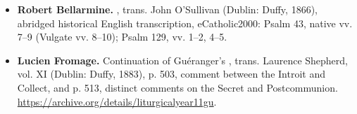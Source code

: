 \begin{itemize}
\item \textbf{Robert Bellarmine.} , trans. John O'Sullivan (Dublin: Duffy, 1866),
abridged historical English transcription, eCatholic2000:
Psalm 43, native vv. 7--9 (Vulgate vv. 8--10); Psalm 129,
vv. 1--2, 4--5.

\item \textbf{Lucien Fromage.} Continuation of Guéranger's
, trans. Laurence Shepherd,
vol. XI (Dublin: Duffy, 1883), p. 503, comment between the
Introit and Collect, and p. 513, distinct comments on the Secret
and Postcommunion.
\url{https://archive.org/details/liturgicalyear11gu}.
\end{itemize}
